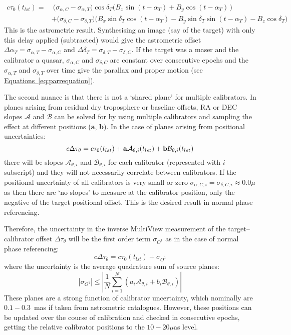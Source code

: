 		\begin{align*}
				c\tau_0(t_{lst}) =&~ \big(\sigma_{\alpha,C} - \sigma_{\alpha,T}\big)\cos\delta_T\big(B_x\sin(t-\alpha_T)+B_y\cos(t-\alpha_T)\,\big) \\
				&+\big(\sigma_{\delta,C} - \sigma_{\delta,T}\big)\big(B_x\sin\delta_T\cos(t-\alpha_T)-B_y\sin\delta_T\sin(t-\alpha_T)-B_z\cos\delta_T\big)
		\end{align*} This is the astrometric result. Synthesising an image (say of the target) with only this delay applied (subtracted) would give the astrometric offset $\Delta\alpha_T=\sigma_{\alpha,T} - \sigma_{\alpha,C}$ and $\Delta\delta_T=\sigma_{\delta,T} - \sigma_{\delta,C}$. If the target was a maser and the calibrator a quasar, $\sigma_{\alpha,C}$ and $\sigma_{\delta,C}$ are constant over consecutive epochs and the $\sigma_{\alpha,T}$ and $\sigma_{\delta,T}$ over time give the parallax and proper motion (see \hyperref[eq:parrequation]{Equations~\ref*{eq:parrequation}}).
		
		The second nuance is that there is not a `shared plane' for multiple calibrators. In planes arising from residual dry troposphere or baseline offsets, RA or DEC slopes $\mathcal{A}$ and $\mathcal{B}$ can be solved for by using multiple calibrators and sampling the effect at different positions (\textbf{a}, \textbf{b}). In the case of planes arising from positional uncertainties:
		\begin{equation}
		     c\Delta\tau_\theta = c\tau_0(t_{lst}) + {\bf a} \mathcal{A}_{\theta,i}(t_{lst}) + {\bf b}\mathcal{B}_{\theta,i}(t_{lst})
		\end{equation} there will be slopes $\mathcal{A}_{\theta,i}$ and $\mathcal{B}_{\theta,i}$ for each calibrator (represented with $i$ subscript) and they will not necessarily correlate between calibrators. If the positional uncertainty of all calibrators is very small or zero $\sigma_{\alpha,C,i}=\sigma_{\delta,C,i}\approx0.0\mu$as then there are `no slopes' to measure at the calibrator position, only the negative of the target positional offset. This is the desired result in normal phase referencing.
		
		Therefore, the uncertainty in the inverse MultiView measurement of the target--calibrator offset $\Delta\tau_\theta$ will be the first order term $\sigma_{O^1}$ as in the case of normal phase referencing:
		\begin{equation}
			c\Delta\tau_\theta = c\tau_0(t_{lst}) + \sigma_{O^1}
		\end{equation} where the uncertainty is the average quadrature sum of source planes:		
		\begin{equation}
			|\sigma_{O^1}|\le|\frac{1}{N}\sum_{i=1}^N\left(a_i\mathcal{A}_{\theta,i}+b_i\mathcal{B}_{\theta,i}\right)|
		\end{equation} 
		These planes are a strong function of calibrator uncertainty, which nominally are $0.1-0.3$~mas if taken from astrometric catalogues. However, these positions can be updated over the course of calibration and checked in consecutive epochs, getting the relative calibrator positions to the $10-20\mu$as level.
		
